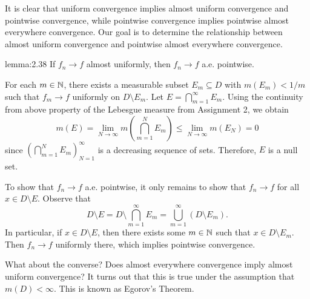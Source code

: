 It is clear that uniform convergence implies almost uniform convergence 
and pointwise convergence, while pointwise convergence implies 
pointwise almost everywhere convergence. Our goal is to determine the 
relationship between almost uniform convergence and pointwise almost 
everywhere convergence. 

\begin{lemma}{lemma:2.38}
    If $f_n \to f$ almost uniformly, then $f_n \to f$ a.e. pointwise. 
\end{lemma}
\begin{pf}
    For each $m \in \mathbb{N}$, there exists a measurable subset $E_m \subseteq D$ 
    with $m(E_m) < 1/m$ such that $f_m \to f$ uniformly on $D \setminus E_m$. 
    Let $E = \bigcap_{m=1}^\infty E_m$. Using the continuity from above 
    property of the Lebesgue measure from Assignment 2, we obtain 
    \[ m(E) = \lim_{N\to\infty} m\!\left( \bigcap_{m=1}^N E_m \right) 
    \leq \lim_{N\to\infty} m(E_N) = 0 \] 
    since $(\bigcap_{m=1}^N E_m)_{N=1}^\infty$ is a decreasing sequence of sets. 
    Therefore, $E$ is a null set. 

    To show that $f_n \to f$ a.e. pointwise, it only remains to show that 
    $f_n \to f$ for all $x \in D \setminus E$. Observe that 
    \[ D \setminus E = D \setminus \bigcap_{m=1}^\infty E_m = 
    \bigcup_{m=1}^\infty (D \setminus E_m). \] 
    In particular, if $x \in D \setminus E$, then there exists some $m \in \mathbb{N}$ 
    such that $x \in D \setminus E_m$. Then $f_n \to f$ uniformly there, 
    which implies pointwise convergence. 
\end{pf}

What about the converse? Does almost everywhere convergence imply 
almost uniform convergence? It turns out that this is true under the 
assumption that $m(D) < \infty$. This is known as Egorov's Theorem. 

